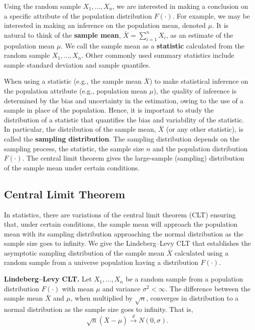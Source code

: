 \documentclass[]{book}
\theoremstyle{definition}
\theoremstyle{definition}
\theoremstyle{definition}
\theoremstyle{remark}
\begin{document}
Using the random sample \(X_1, \ldots, X_n\), we are interested in
making a conclusion on a specific attribute of the population
distribution \(F(\cdot)\). For example, we may be interested in making
an inference on the population mean, denoted \(\mu\). It is natural to
think of the \textbf{sample mean}, \(\bar{X}=\sum_{i=1}^nX_i\), as an
estimate of the population mean \(\mu\). We call the sample mean as a
\textbf{statistic} calculated from the random sample
\(X_1, \ldots, X_n\). Other commonly used summary statistics include
sample standard deviation and sample quantiles.

When using a statistic (e.g., the sample mean \(\bar{X}\)) to make
statistical inference on the population attribute (e.g., population mean
\(\mu\)), the quality of inference is determined by the bias and
uncertainty in the estimation, owing to the use of a sample in place of
the population. Hence, it is important to study the distribution of a
statistic that quantifies the bias and variability of the statistic. In
particular, the distribution of the sample mean, \(\bar{X}\) (or any
other statistic), is called the \textbf{sampling distribution}. The
sampling distribution depends on the sampling process, the statistic,
the sample size \(n\) and the population distribution \(F(\cdot)\). The
central limit theorem gives the large-sample (sampling) distribution of
the sample mean under certain conditions.

\subsection{Central Limit Theorem}\label{central-limit-theorem}

In statistics, there are variations of the central limit theorem (CLT)
ensuring that, under certain conditions, the sample mean will approach
the population mean with its sampling distribution approaching the
normal distribution as the sample size goes to infinity. We give the
Lindeberg--Levy CLT that establishes the asymptotic sampling
distribution of the sample mean \(\bar{X}\) calculated using a random
sample from a universe population having a distribution \(F(\cdot)\).

\textbf{Lindeberg--Levy CLT.} Let \(X_1, \ldots, X_n\) be a random
sample from a population distribution \(F(\cdot)\) with mean \(\mu\) and
variance \(\sigma^2<\infty\). The difference between the sample mean
\(\bar{X}\) and \(\mu\), when multiplied by \(\sqrt{n}\), converges in
distribution to a normal distribution as the sample size goes to
infinity. That is,
\[\sqrt{n}(\bar{X}-\mu)\xrightarrow[]{d}N(0,\sigma).\]
\end{document}
